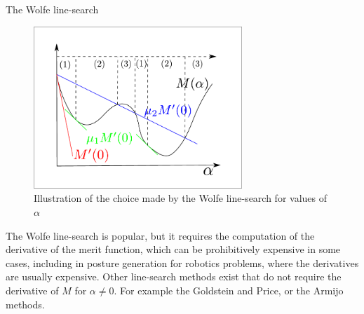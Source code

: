 \begin{algorithm}
\begin{algorithmic}
  \EndLoop{}
  \caption{The Wolfe line-search}
\label{alg:Wolfe}
\end{algorithmic}
\end{algorithm}

\begin{figure}
  \centering
  \includegraphics[width=0.7\textwidth]{line-search.pdf}
  \caption{Illustration of the choice made by the Wolfe line-search for values of $\alpha$}
\label{fig:Wolfe}
\end{figure}

The Wolfe line-search is popular, but it requires the computation of the derivative of the merit function, which can be prohibitively expensive in some cases, including in posture generation for robotics problems, where the derivatives are usually expensive.
Other line-search methods exist that do not require the derivative of $M$ for $\alpha\neq0$. For example the Goldstein and Price, or the Armijo methods.

